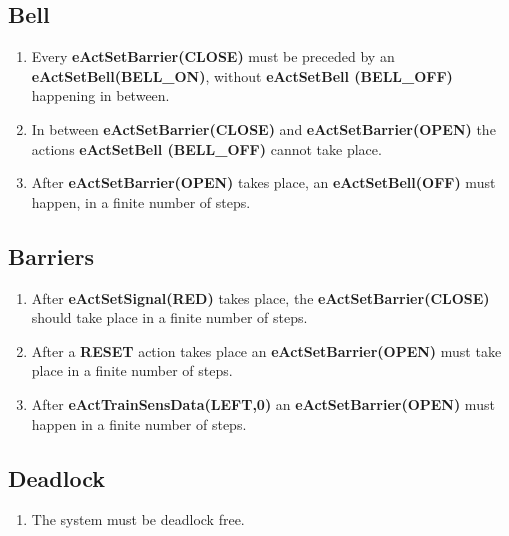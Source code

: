 \documentclass[10pt,a4paper]{article}
\begin{document}
\subsection{Bell}
\begin{enumerate}[resume]
\item Every \textbf{eActSetBarrier(CLOSE)} must be preceded by an \textbf{eActSetBell(BELL\_ON)}, without \textbf{eActSetBell (BELL\_OFF) }happening in between.
\item In between \textbf {eActSetBarrier(CLOSE) }and \textbf{eActSetBarrier(OPEN)} the actions \textbf {eActSetBell (BELL\_OFF)} cannot take place.
\item After \textbf{eActSetBarrier(OPEN) }takes place, an \textbf{eActSetBell(OFF)} must happen, in a finite number of steps.
\end{enumerate}

\subsection{Barriers}
\begin{enumerate}[resume]
\item After \textbf{eActSetSignal(RED)} takes place, the \textbf{eActSetBarrier(CLOSE)} should take place in a finite number of steps.
\item After a \textbf{RESET} action takes place an \textbf{eActSetBarrier(OPEN)} must take place in a finite number of steps.
\item After \textbf{eActTrainSensData(LEFT,0)} an \textbf{eActSetBarrier(OPEN)} must happen in a finite number of steps.
\end{enumerate}

\subsection{Deadlock}
\begin{enumerate}[resume]
\item The system must be deadlock free.
\end{enumerate}

\newpage
\end{document}
